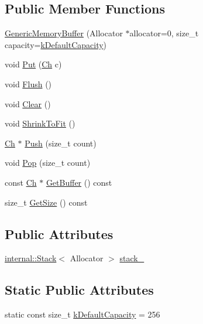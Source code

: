 \subsection*{Public Member Functions}
\begin{DoxyCompactItemize}
\item 
\hyperlink{structGenericMemoryBuffer_ad08f7da47bca43fcdb0c3b10e22dfa1d}{Generic\+Memory\+Buffer} (Allocator $\ast$allocator=0, size\+\_\+t capacity=\hyperlink{structGenericMemoryBuffer_af6ecdbdbb8d3aa53cdef6e788e4980be}{k\+Default\+Capacity})
\item 
void \hyperlink{structGenericMemoryBuffer_a9dfb477983e211893601f8ab637b42d8}{Put} (\hyperlink{structGenericMemoryBuffer_a212f137abfd8bce2ad216b2d960c027f}{Ch} c)
\item 
void \hyperlink{structGenericMemoryBuffer_a9861181cab6f5bec2ec08b601aa53575}{Flush} ()
\item 
void \hyperlink{structGenericMemoryBuffer_a036cbe2556778e1edc525602a9821df2}{Clear} ()
\item 
void \hyperlink{structGenericMemoryBuffer_a3b87deb9bf34c394c8fb262ab53c0c4b}{Shrink\+To\+Fit} ()
\item 
\hyperlink{structGenericMemoryBuffer_a212f137abfd8bce2ad216b2d960c027f}{Ch} $\ast$ \hyperlink{structGenericMemoryBuffer_a56f7b14d2940b682fe592f598d6792ec}{Push} (size\+\_\+t count)
\item 
void \hyperlink{structGenericMemoryBuffer_a82a6706286f1356e1769282f5d496005}{Pop} (size\+\_\+t count)
\item 
const \hyperlink{structGenericMemoryBuffer_a212f137abfd8bce2ad216b2d960c027f}{Ch} $\ast$ \hyperlink{structGenericMemoryBuffer_a9afc78eef159fcbc10d0cea84ccfb26d}{Get\+Buffer} () const 
\item 
size\+\_\+t \hyperlink{structGenericMemoryBuffer_adc22f10318fa6dbdf7eb1fa9041bb68d}{Get\+Size} () const 
\end{DoxyCompactItemize}
\subsection*{Public Attributes}
\begin{DoxyCompactItemize}
\item 
\hyperlink{classinternal_1_1Stack}{internal\+::\+Stack}$<$ Allocator $>$ \hyperlink{structGenericMemoryBuffer_a977b479180bebe8ae14ca1c11d52a486}{stack\+\_\+}
\end{DoxyCompactItemize}
\subsection*{Static Public Attributes}
\begin{DoxyCompactItemize}
\item 
static const size\+\_\+t \hyperlink{structGenericMemoryBuffer_af6ecdbdbb8d3aa53cdef6e788e4980be}{k\+Default\+Capacity} = 256
\end{DoxyCompactItemize}


